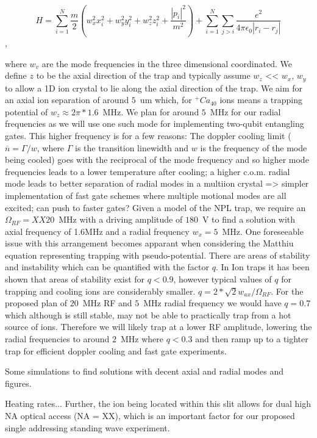 \documentclass{article}
\begin{document}
$$ H = \sum_{i=1}^N \frac{m}{2}(w_x^2x_i^2 + w_y^2y_i^2 + w_z^2z_i^2 + \frac{|p_i|^2}{m^2}) + \sum_{i=1}^N\sum_{j>i}\frac{e^2}{4\pi\epsilon_0|r_i - r_j|}$$,

where $w_v$ are the mode frequencies in the three dimensional
coordinated. We define $z$ to be the axial direction of the trap and
typically assume $w_z$ << $w_x$, $w_y$ to allow a 1D ion crystal to
lie along the axial direction of the trap. We aim for an axial ion
separation of around $5$~um which, for $^+Ca_{40}$ ions means a
trapping potential of $w_z \approx 2\pi * 1.6$~MHz. We plan for around
$5$~MHz for our radial frequencies as we will use one such mode for
implementing two-qubit entangling gates. This higher frequency is for
a few reasons: The doppler cooling limit ($\overline{n} = \Gamma/w$,
where $\Gamma$ is the transition linewidth and $w$ is the
frequency of the mode being cooled) goes with the reciprocal of the
mode frequency and so higher mode frequencies leads to a lower
temperature after cooling; a higher c.o.m. radial mode leads to better
separation of radial modes in a multiion crystal => simpler
implementation of fast gate schemes where multiple motional modes are
all excited; can push to faster gates?  Given a model of the NPL trap,
we require an $\Omega_{RF} = XX20$~MHz with a driving amplitude of
$180$~V to find a solution with axial frequency of 1.6MHz and a radial
frequency $w_x = 5$~MHz.
One foreseeable issue with this arrangement becomes apparant when
considering the Matthiu equation representing trapping with
pseudo-potential. There are areas of stability and instability which
can be quantified with the factor $q$. In Ion traps it has been shown
that areas of stability exist for $q<0.9$, however typical values of
$q$ for trapping and cooling ions are considerably smaller.
$q = 2*\sqrt{2}w_{ax}/\Omega_{RF}$.
For the proposed plan of $20$~MHz RF and $5$~MHz radial frequency we
would have $q = 0.7$ which although is still stable, may not be able
to practically trap from a hot source of ions. Therefore we will
likely trap at a lower RF amplitude, lowering the radial frequencies
to around $2$~MHz where $q<0.3$ and then ramp up to a tighter trap for
efficient doppler cooling and fast gate experiments.

Some simulations to find solutions with decent axial and radial modes and figures.

Heating rates... Further, the ion being located within this
slit allows for dual high NA optical access (NA = XX), which is an
important factor for our proposed single addressing standing wave
experiment.
\end{document}
